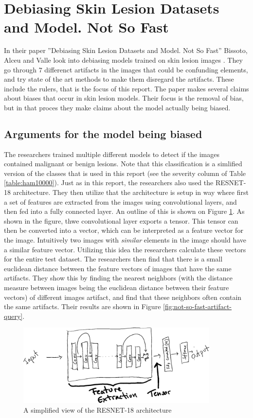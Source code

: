 \section{Debiasing Skin Lesion Datasets and Model. Not So Fast}\label{sec:debias-not-so-fast}
In their paper
''Debiasing Skin Lesion Datasets and Model. Not So Fast''
Bissoto, Alceu and Valle look into debiasing models trained on
skin lesion images \cite{debias-not-so-fast}.
They go through $7$ differenct artifacts in the images that could
be confunding elements, and try state of the art methods to
make them disregard the artifacts.
These include the rulers, that is the focus of this report.
The paper makes several claims about biases that occur in
skin lesion models.
Their focus is the removal of bias, but in that proces they
make claims about the model actually being biased.

\subsection{Arguments for the model being biased}
The researchers trained multiple different models to detect if the
images contained malignant or benign lesions.
Note that this classification is a simlified version of the classes
that is used in this report (see the severity column of Table \ref{table:ham10000}).
Just as in this report, the researchers also used the RESNET-18 architecture.
They then utilize that the architecture is setup in way where first a set of features
are extracted from the images using convolutional layers, and then fed into a fully connected layer. 
An outline of this is shown on Figure \ref{fig:resnet-outline}.
As shown in the figure, thwe convolutional layer exports a tensor.
This tensor can then be converted into a vector, which can be interpreted as a feature vector for the image.
Intuitively two images with \textit{similar} elements in the image should have a similar feature vector.
Utilizing this idea the researchers calculate these vectors for the entire test dataset.
The researchers then find that there is a small euclidean distance between the feature vectors of images
that have the same artifacts.
They show this by finding the nearest neighbors (with the distance measure between images being the euclidean distance between their feature vectors)
of different images artifact, and find that these neighbors often contain the same artifacts.
Their results are shown in Figure \ref{fig:not-so-fast-artifact-query}.


\begin{figure}[h]
    \centering
    \includegraphics[width=0.9\textwidth]{images/resnet-outline.png}
    \caption{A simplified view of the RESNET-18 architecture}
    \label{fig:resnet-outline}
\end{figure}

